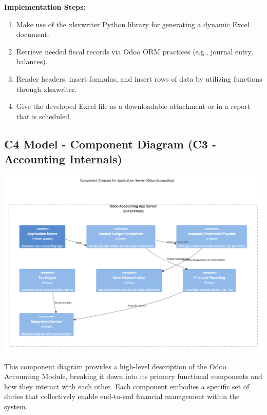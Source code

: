 \documentclass[11pt,a4paper]{article}
\begin{document}
\begin{enumerate}
    \textbf{Implementation Steps:}
        \begin{enumerate}
            \item Make use of the xlsxwriter Python library for generating a dynamic Excel document.
            \item Retrieve needed fiscal records via Odoo ORM practices (e.g., journal entry, balances).
            \item Render headers, insert formulas, and insert rows of data by utilizing functions through xlsxwriter.
            \item Give the developed Excel file as a downloadable attachment or in a report that is scheduled.
        \end{enumerate}
\end{enumerate}

\subsection{C4 Model - Component Diagram (C3 - Accounting Internals)}
\begin{center}
    \includegraphics[width=0.8\linewidth]{diagram/C3.png}
\end{center}

\noindent This component diagram provides a high-level description of the Odoo Accounting Module, breaking it down into its primary functional components and how they interact with each other. Each component embodies a specific set of duties that collectively enable end-to-end financial management within the system.
\end{document}
